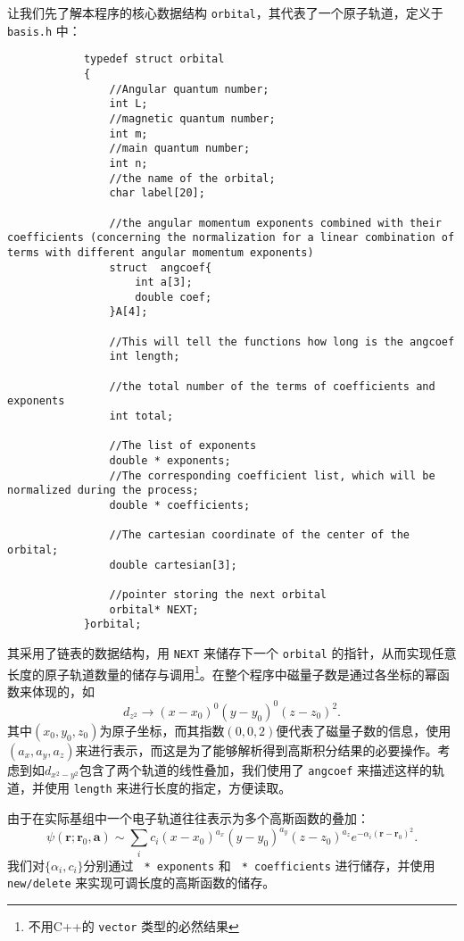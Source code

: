 \documentclass[12pt,a4paper,openany,twoside]{article}
\numberwithin{equation}{section}
\begin{document}
        让我们先了解本程序的核心数据结构 \lstinline$orbital$，其代表了一个原子轨道，定义于 \lstinline$basis.h$ 中：
        \begin{lstlisting}
            typedef struct orbital
            {
                //Angular quantum number;
                int L;
                //magnetic quantum number;
                int m;
                //main quantum number;
                int n;
                //the name of the orbital;
                char label[20];

                //the angular momentum exponents combined with their coefficients (concerning the normalization for a linear combination of terms with different angular momentum exponents)
                struct  angcoef{
                    int a[3];
                    double coef;
                }A[4];

                //This will tell the functions how long is the angcoef
                int length;

                //the total number of the terms of coefficients and exponents 
                int total;

                //The list of exponents
                double * exponents;
                //The corresponding coefficient list, which will be normalized during the process;
                double * coefficients;

                //The cartesian coordinate of the center of the orbital;
                double cartesian[3];

                //pointer storing the next orbital
                orbital* NEXT;
            }orbital;
        \end{lstlisting}
        其采用了链表的数据结构，用 \lstinline$NEXT$ 来储存下一个 \lstinline$orbital$ 的指针，从而实现任意长度的原子轨道数量的储存与调用\footnote{不用C++的 \lstinline$vector$ 类型的必然结果}。在整个程序中磁量子数是通过各坐标的幂函数来体现的，如
        \[
            d_{z^2} \rightarrow (x-x_0)^0 (y-y_0)^0 (z-z_0)^2.
        \]
        其中$(x_0,y_0,z_0)$为原子坐标，而其指数$(0,0,2)$便代表了磁量子数的信息，使用$(a_x,a_y,a_z)$来进行表示，而这是为了能够解析得到高斯积分结果的必要操作。考虑到如$d_{x^2-y^2}$包含了两个轨道的线性叠加，我们使用了 \lstinline$angcoef$ 来描述这样的轨道，并使用 \lstinline$length$ 来进行长度的指定，方便读取。

        由于在实际基组中一个电子轨道往往表示为多个高斯函数的叠加：
        \begin{equation}
            \psi (\boldsymbol{r};\boldsymbol{r}_0,\boldsymbol{a}) \sim \sum_i c_i (x-x_0)^{a_x}(y-y_0)^{a_y}(z-z_0)^{a_z} e^{- \alpha_i (\boldsymbol{r} - \boldsymbol{r}_0)^2}.
        \end{equation}
        我们对$\{\alpha_i,c_i\}$分别通过 \lstinline$ * exponents$ 和 \lstinline$ * coefficients$ 进行储存，并使用 \lstinline$new/delete$ 来实现可调长度的高斯函数的储存。
\end{document}
